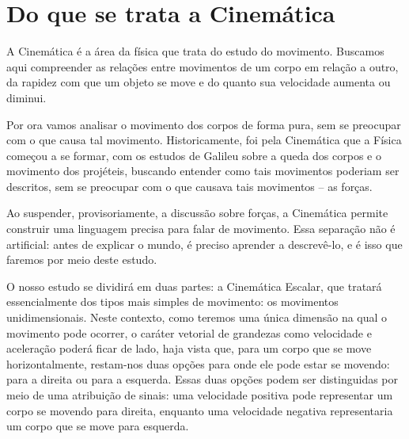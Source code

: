 
\chapter*{Do que se trata a Cinemática}








A Cinemática é a área da física que trata do estudo do movimento. Buscamos aqui compreender as relações entre movimentos de um corpo em relação a outro, da rapidez com que um objeto se move e do quanto sua velocidade aumenta ou diminui.

Por ora vamos analisar o movimento dos corpos de forma pura, sem se preocupar com o que causa tal movimento. Historicamente, foi pela Cinemática que a Física começou a se formar, com os estudos de Galileu sobre a queda dos corpos e o movimento dos projéteis, buscando entender como tais movimentos poderiam ser descritos, sem se preocupar com o que causava tais movimentos -- as forças.

Ao suspender, provisoriamente, a discussão sobre forças, a Cinemática permite construir uma linguagem precisa para falar de movimento. Essa separação não é artificial: antes de explicar o mundo, é preciso aprender a descrevê-lo, e é isso que faremos por meio deste estudo.


O nosso estudo se dividirá em duas partes: a Cinemática Escalar, que tratará essencialmente dos tipos mais simples de movimento: os movimentos unidimensionais. Neste contexto, como teremos uma única dimensão na qual o movimento pode ocorrer, o caráter vetorial de grandezas como velocidade e aceleração poderá ficar de lado, haja vista que, para um corpo que se move horizontalmente, restam-nos duas opções para onde ele pode estar se movendo: para a direita ou para a esquerda. Essas duas opções podem ser distinguidas por meio de uma atribuição de sinais: uma velocidade positiva pode representar um corpo se movendo para direita, enquanto uma velocidade negativa representaria um corpo que se move para esquerda.

